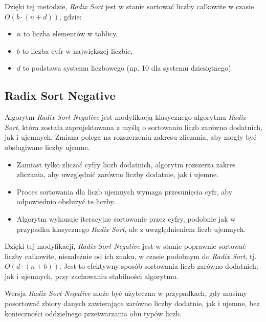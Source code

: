 \documentclass[a4paper,12pt]{article}
\begin{document}
Dzięki tej metodzie, \textit{Radix Sort} jest w stanie sortować liczby całkowite w czasie \(O(b \cdot (n + d))\), gdzie:
\begin{itemize}
    \item \(n\) to liczba elementów w tablicy,
    \item \(b\) to liczba cyfr w największej liczbie,
    \item \(d\) to podstawa systemu liczbowego (np. 10 dla systemu dziesiętnego).
\end{itemize}

\subsection{Radix Sort Negative}
Algorytm \textit{Radix Sort Negative} jest modyfikacją klasycznego algorytmu \textit{Radix Sort}, która została zaprojektowana z myślą o sortowaniu liczb zarówno dodatnich, jak i ujemnych. Zmiana polega na rozszerzeniu zakresu zliczania, aby mogły być obsługiwane liczby ujemne.

\begin{itemize}
    \item Zamiast tylko zliczać cyfry liczb dodatnich, algorytm rozszerza zakres zliczania, aby uwzględnić zarówno liczby dodatnie, jak i ujemne.
    \item Proces sortowania dla liczb ujemnych wymaga przesunięcia cyfr, aby odpowiednio obsłużyć te liczby.
    \item Algorytm wykonuje iteracyjne sortowanie przez cyfry, podobnie jak w przypadku klasycznego \textit{Radix Sort}, ale z uwzględnieniem liczb ujemnych.
\end{itemize}

Dzięki tej modyfikacji, \textit{Radix Sort Negative} jest w stanie poprawnie sortować liczby całkowite, niezależnie od ich znaku, w czasie podobnym do \textit{Radix Sort}, tj. \(O(d \cdot (n + b))\). Jest to efektywny sposób sortowania liczb zarówno dodatnich, jak i ujemnych, przy zachowaniu stabilności algorytmu.

Wersja \textit{Radix Sort Negative} może być użyteczna w przypadkach, gdy musimy posortować zbiory danych zawierające zarówno liczby dodatnie, jak i ujemne, bez konieczności oddzielnego przetwarzania obu typów liczb.
\end{document}
